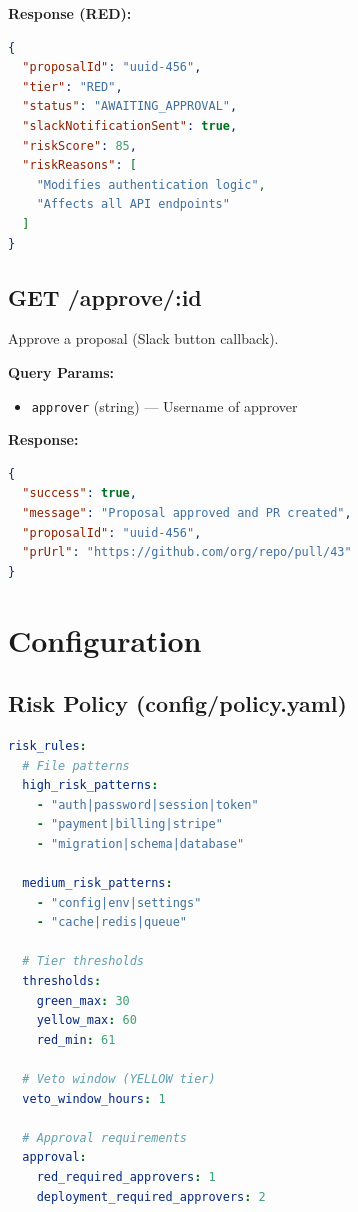 \documentclass[11pt,a4paper]{article}
\begin{document}
\textbf{Response (RED):}
\begin{lstlisting}[language=json]
{
  "proposalId": "uuid-456",
  "tier": "RED",
  "status": "AWAITING_APPROVAL",
  "slackNotificationSent": true,
  "riskScore": 85,
  "riskReasons": [
    "Modifies authentication logic",
    "Affects all API endpoints"
  ]
}
\end{lstlisting}

\subsection{GET /approve/:id}
Approve a proposal (Slack button callback).

\textbf{Query Params:}
\begin{itemize}
    \item \texttt{approver} (string) --- Username of approver
\end{itemize}

\textbf{Response:}
\begin{lstlisting}[language=json]
{
  "success": true,
  "message": "Proposal approved and PR created",
  "proposalId": "uuid-456",
  "prUrl": "https://github.com/org/repo/pull/43"
}
\end{lstlisting}

\newpage
\section{Configuration}

\subsection{Risk Policy (config/policy.yaml)}
\begin{lstlisting}[language=yaml,caption=Policy Configuration]
risk_rules:
  # File patterns
  high_risk_patterns:
    - "auth|password|session|token"
    - "payment|billing|stripe"
    - "migration|schema|database"
  
  medium_risk_patterns:
    - "config|env|settings"
    - "cache|redis|queue"
  
  # Tier thresholds
  thresholds:
    green_max: 30
    yellow_max: 60
    red_min: 61
  
  # Veto window (YELLOW tier)
  veto_window_hours: 1
  
  # Approval requirements
  approval:
    red_required_approvers: 1
    deployment_required_approvers: 2
\end{lstlisting}
\end{document}
